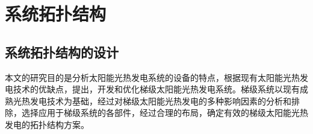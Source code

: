 \chapter{系统拓扑结构}
\label{cha:SystemTopology}
\section{系统拓扑结构的设计}
\label{sec:std}

本文的研究目的是分析太阳能光热发电系统的设备的特点，根据现有太阳能光热发电技术的优缺点，提出，开发和优化梯级太阳能光热发电系统。梯级系统以现有成熟光热发电技术为基础，经过对梯级太阳能光热发电的多种影响因素的分析和排除，选择应用于梯级系统的各部件，经过合理的布局，确定有效的梯级太阳能光热发电的拓扑结构方案。

